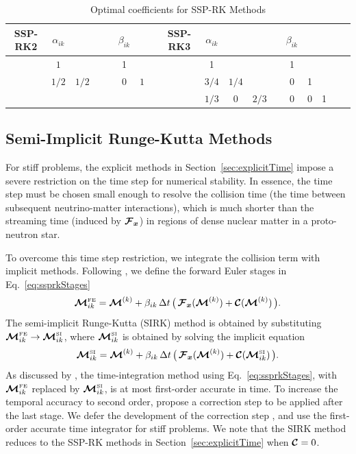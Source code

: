 \documentclass[10pt,preprint]{aastex}
\begin{document}
\begin{table}
  \begin{center}
  \caption{Optimal coefficients for SSP-RK Methods \citep{shuOsher_1988} \label{tab:ssprkCoefficients}}
  \begin{tabular}{cccccccccccccccccc}
    \midrule
     SSP-RK2 & $\alpha_{ik}$ & & & & $\beta_{ik}$ & & & SSP-RK3 & $\alpha_{ik}$ & & & & $\beta_{ik}$ \\
    \midrule
    \midrule
      & $1$ & & & & 1 & & & & 1 & & & & 1 \\  
      & $1/2$ & $1/2$ & & & $0$ & $1$ & & & $3/4$ & $1/4$ & & & 0 & 1  \\
      & & & & & & & & & $1/3$ & 0 & $2/3$ & & 0 & 0 & 1 \\ 
    \midrule
    \midrule
  \end{tabular}
  \end{center}
\end{table}

\subsection{Semi-Implicit Runge-Kutta Methods}
\label{sec:semiImplicitTime}

For stiff problems, the explicit methods in Section~\ref{sec:explicitTime} impose a severe restriction on the time step for numerical stability.  
In essence, the time step must be chosen small enough to resolve the collision time (the time between subsequent neutrino-matter interactions), which is much shorter than the streaming time (induced by $\boldsymbol{\mathcal{F}}_{\boldsymbol{x}}$) in regions of dense nuclear matter in a proto-neutron star.  

To overcome this time step restriction, we integrate the collision term with implicit methods.  
Following \citet{chertock_etal_2015}, we define the forward Euler stages in Eq.~\eqref{eq:ssprkStages}
\begin{equation}
  \boldsymbol{\mathcal{M}}_{ik}^{\mbox{\tiny FE}}
  =\boldsymbol{\mathcal{M}}^{(k)}+\beta_{ik}\,\Delta t\,\big(\,\boldsymbol{\mathcal{F}}_{\boldsymbol{x}}(\boldsymbol{\mathcal{M}}^{(k)})+\boldsymbol{\mathcal{C}}(\boldsymbol{\mathcal{M}}^{(k)})\,\big).  
\end{equation}
The semi-implicit Runge-Kutta (SIRK) method is obtained by substituting $\boldsymbol{\mathcal{M}}_{ik}^{\mbox{\tiny FE}}\to\boldsymbol{\mathcal{M}}_{ik}^{\mbox{\tiny SI}}$, where $\boldsymbol{\mathcal{M}}_{ik}^{\mbox{\tiny SI}}$ is obtained by solving the implicit equation
\begin{equation}
  \boldsymbol{\mathcal{M}}_{ik}^{\mbox{\tiny SI}}
  =\boldsymbol{\mathcal{M}}^{(k)}+\beta_{ik}\,\Delta t\,\big(\,\boldsymbol{\mathcal{F}}_{\boldsymbol{x}}(\boldsymbol{\mathcal{M}}^{(k)})+\boldsymbol{\mathcal{C}}(\boldsymbol{\mathcal{M}}_{ik}^{\mbox{\tiny SI}})\,\big).  
\end{equation}
As discussed by \citet{chertock_etal_2015}, the time-integration method using Eq.~\eqref{eq:ssprkStages}, with $\boldsymbol{\mathcal{M}}_{ik}^{\mbox{\tiny FE}}$ replaced by $\boldsymbol{\mathcal{M}}_{ik}^{\mbox{\tiny SI}}$, is at most first-order accurate in time.  
To increase the temporal accuracy to second order, \citet{chertock_etal_2015} propose a correction step to be applied after the last stage.  
We defer the development of the correction step \citep[see, e.g.][]{endeveHauck_2017}, and use the first-order accurate time integrator for stiff problems.  
We note that the SIRK method reduces to the SSP-RK methods in Section~\ref{sec:explicitTime} when $\boldsymbol{\mathcal{C}}=0$.  
\end{document}
